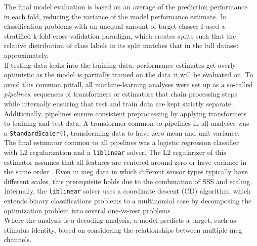 The final model evaluation is based on an average of the prediction performance in each fold, reducing the variance of the model performance estimate.
In classification problems with an unequal amount of target classes I used a stratified k-fold cross-validation paradigm, which creates splits such that the relative distribution of class labels in its split matches that in the full dataset approximately.\\
If testing data leaks into the training data, performance estimates get overly optimistic as the model is partially trained on the data it will be evaluated on.
To avoid this common pitfall, all machine-learning analyses were set up as a so-called \textit{pipelines}, sequences of transformers or estimators that chain processing steps while internally ensuring that test and train data are kept strictly separate.
Additionally, pipelines ensure consistent preprocessing by applying transformers to training and test data.
A transformer common to pipelines in all analyses was a \texttt{StandardScaler()}, transforming data to have zero mean and unit variance.
The final estimator common to all pipelines was a logistic regression classifier with L2 regularization and a \texttt{liblinear} solver.
The L2 regularizer of this estimator assumes that all features are centered around zero or have variance in the same order \citep{scikit-learn-scaler}.
Even in \gls{meg} data in which different sensor types typically have different scales, this prerequisite holds due to the combination of \gls{SSS} and scaling.
Internally, the \texttt{liblinear} solver uses a coordinate descent (CD) algorithm, which extends binary classifications problems to a multinomial case by decomposing the optimization problem into several one-vs-rest problems \citep{scikit-learn-liblinear}.\\
Where the analysis is a decoding analysis, a model predicts a target, such as stimulus identity, based on considering the relationships between multiple \gls{meg} channels.



